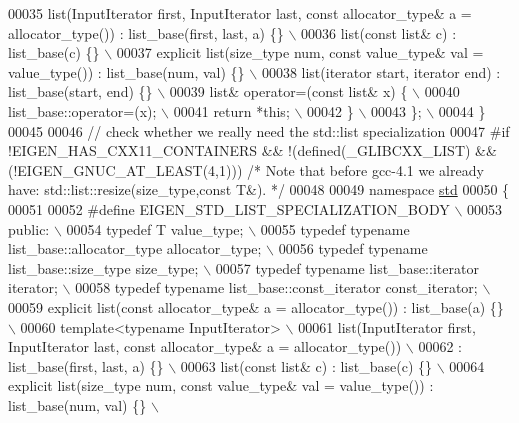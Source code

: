 \begin{DoxyCode}
00035 \textcolor{preprocessor}{    list(InputIterator first, InputIterator last, const allocator\_type& a = allocator\_type()) :
       list\_base(first, last, a) \{\} \(\backslash\)}
00036 \textcolor{preprocessor}{    list(const list& c) : list\_base(c) \{\}  \(\backslash\)}
00037 \textcolor{preprocessor}{    explicit list(size\_type num, const value\_type& val = value\_type()) : list\_base(num, val) \{\} \(\backslash\)}
00038 \textcolor{preprocessor}{    list(iterator start, iterator end) : list\_base(start, end) \{\}  \(\backslash\)}
00039 \textcolor{preprocessor}{    list& operator=(const list& x) \{  \(\backslash\)}
00040 \textcolor{preprocessor}{      list\_base::operator=(x);  \(\backslash\)}
00041 \textcolor{preprocessor}{      return *this;  \(\backslash\)}
00042 \textcolor{preprocessor}{    \} \(\backslash\)}
00043 \textcolor{preprocessor}{  \}; \(\backslash\)}
00044 \textcolor{preprocessor}{\}}
00045 
00046 \textcolor{comment}{// check whether we really need the std::list specialization}
00047 \textcolor{preprocessor}{#if !EIGEN\_HAS\_CXX11\_CONTAINERS && !(defined(\_GLIBCXX\_LIST) && (!EIGEN\_GNUC\_AT\_LEAST(4,1))) }\textcolor{comment}{/* Note that
       before gcc-4.1 we already have: std::list::resize(size\_type,const T&). */}\textcolor{preprocessor}{}
00048 
00049 \textcolor{keyword}{namespace }\hyperlink{namespacestd}{std}
00050 \{
00051 
00052 \textcolor{preprocessor}{#define EIGEN\_STD\_LIST\_SPECIALIZATION\_BODY \(\backslash\)}
00053 \textcolor{preprocessor}{  public:  \(\backslash\)}
00054 \textcolor{preprocessor}{    typedef T value\_type; \(\backslash\)}
00055 \textcolor{preprocessor}{    typedef typename list\_base::allocator\_type allocator\_type; \(\backslash\)}
00056 \textcolor{preprocessor}{    typedef typename list\_base::size\_type size\_type;  \(\backslash\)}
00057 \textcolor{preprocessor}{    typedef typename list\_base::iterator iterator;  \(\backslash\)}
00058 \textcolor{preprocessor}{    typedef typename list\_base::const\_iterator const\_iterator;  \(\backslash\)}
00059 \textcolor{preprocessor}{    explicit list(const allocator\_type& a = allocator\_type()) : list\_base(a) \{\}  \(\backslash\)}
00060 \textcolor{preprocessor}{    template<typename InputIterator> \(\backslash\)}
00061 \textcolor{preprocessor}{    list(InputIterator first, InputIterator last, const allocator\_type& a = allocator\_type()) \(\backslash\)}
00062 \textcolor{preprocessor}{    : list\_base(first, last, a) \{\} \(\backslash\)}
00063 \textcolor{preprocessor}{    list(const list& c) : list\_base(c) \{\}  \(\backslash\)}
00064 \textcolor{preprocessor}{    explicit list(size\_type num, const value\_type& val = value\_type()) : list\_base(num, val) \{\} \(\backslash\)}

\end{DoxyCode}
